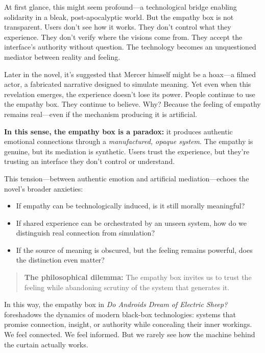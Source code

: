 \begin{tcolorbox}[colback=blue!5!white, colframe=blue!50!black, breakable,
  title={Philosophical Sidebar: The Black Box as Epistemic Mirage}]
\medskip

At first glance, this might seem profound—a technological bridge enabling solidarity in a bleak, post-apocalyptic world. But the empathy box is not transparent. Users don’t see how it works. They don’t control what they experience. They don’t verify where the visions come from. They accept the interface’s authority without question. The technology becomes an unquestioned mediator between reality and feeling.

\medskip

Later in the novel, it’s suggested that Mercer himself might be a hoax—a filmed actor, a fabricated narrative designed to simulate meaning. Yet even when this revelation emerges, the experience doesn’t lose its power. People continue to use the empathy box. They continue to believe. Why? Because the feeling of empathy remains real—even if the mechanism producing it is artificial.

\medskip

\textbf{In this sense, the empathy box is a paradox:} it produces authentic emotional connections through a \textit{manufactured, opaque system}. The empathy is genuine, but its mediation is synthetic. Users trust the experience, but they’re trusting an interface they don’t control or understand.

\medskip

This tension—between authentic emotion and artificial mediation—echoes the novel’s broader anxieties:  

\medskip

\begin{itemize}
    \item If empathy can be technologically induced, is it still morally meaningful?
    \item If shared experience can be orchestrated by an unseen system, how do we distinguish real connection from simulation?
    \item If the source of meaning is obscured, but the feeling remains powerful, does the distinction even matter?
\end{itemize}

\medskip

\begin{quote}
\textbf{The philosophical dilemma:} The empathy box invites us to trust the feeling while abandoning scrutiny of the system that generates it.
\end{quote}

In this way, the empathy box in \textit{Do Androids Dream of Electric Sheep?} foreshadows the dynamics of modern black-box technologies: systems that promise connection, insight, or authority while concealing their inner workings. We feel connected. We feel informed. But we rarely see how the machine behind the curtain actually works.


\end{tcolorbox}
